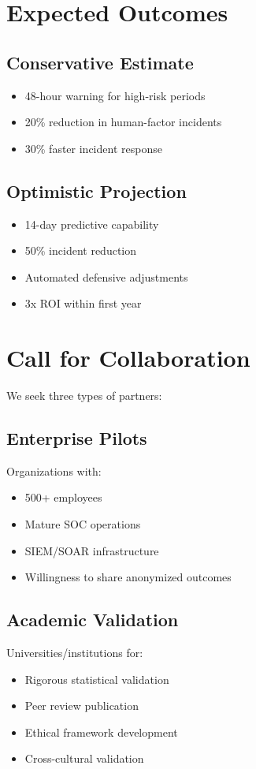 \documentclass[11pt,a4paper]{article}
\begin{document}
\section{Expected Outcomes}

\subsection{Conservative Estimate}
\begin{itemize}
\item 48-hour warning for high-risk periods
\item 20\% reduction in human-factor incidents
\item 30\% faster incident response
\end{itemize}

\subsection{Optimistic Projection}
\begin{itemize}
\item 14-day predictive capability
\item 50\% incident reduction
\item Automated defensive adjustments
\item 3x ROI within first year
\end{itemize}

\section{Call for Collaboration}

We seek three types of partners:

\subsection{Enterprise Pilots}
Organizations with:
\begin{itemize}
\item 500+ employees
\item Mature SOC operations
\item SIEM/SOAR infrastructure
\item Willingness to share anonymized outcomes
\end{itemize}

\subsection{Academic Validation}
Universities/institutions for:
\begin{itemize}
\item Rigorous statistical validation
\item Peer review publication
\item Ethical framework development
\item Cross-cultural validation
\end{itemize}
\end{document}
